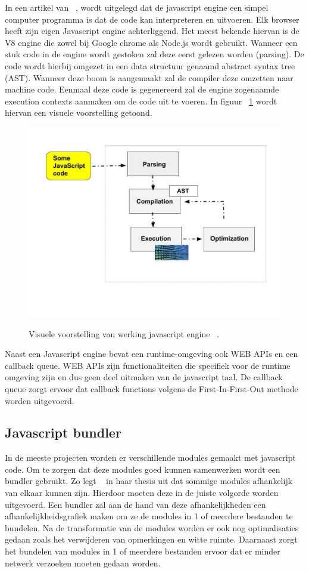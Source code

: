 In een artikel van ~\textcite{Christopher}, 
wordt uitgelegd dat de javascript engine een simpel computer programma is dat de code kan interpreteren en uitvoeren.
Elk browser heeft zijn eigen Javascript engine achterliggend. Het meest bekende hiervan is de
V8 engine die zowel bij Google chrome als Node.js wordt gebruikt. 
Wanneer een stuk code in de engine wordt gestoken zal deze eerst gelezen worden (parsing). 
De code wordt hierbij omgezet in een data structuur genaamd abstract syntax tree (AST).
Wanneer deze boom is aangemaakt zal de compiler deze omzetten naar machine code. 
Eenmaal deze code is gegenereerd zal de engine zogenaamde execution contexts aanmaken om de code uit te voeren.
In figuur ~\ref{fig:javascriptengine} wordt hiervan een visuele voorstelling getoond.
\begin{figure}[H]
    \centering
    \includegraphics[width=.9\textwidth]{graphics/javascriptengine.jpeg}
    \caption{\label{fig:javascriptengine}}Visuele voorstelling van werking javascript engine ~\autocite{Christopher}.
\end{figure}

Naast een Javascript engine bevat een runtime-omgeving ook WEB APIs en een callback queue. 
WEB APIs zijn functionaliteiten die specifiek voor de runtime omgeving zijn en dus geen deel uitmaken van de javascript taal.
De callback queue zorgt ervoor dat callback functions volgens de First-In-First-Out methode worden uitgevoerd.

\subsection{Javascript bundler}
In de meeste projecten worden er verschillende modules gemaakt met javascript code. 
Om te zorgen dat deze modules goed kunnen samenwerken wordt een bundler gebruikt. 
Zo legt ~\textcite{Laurila2020} in haar thesis uit dat sommige modules afhankelijk van elkaar kunnen zijn. 
Hierdoor moeten deze in de juiste volgorde worden uitgevoerd. Een bundler zal aan de hand van deze afhankelijkheden 
een afhankelijkheidsgrafiek maken om ze de modules in 1 of meerdere bestanden te bundelen. 
Na de transformatie van de modules worden er ook nog optimalisaties gedaan zoals het verwijderen van opmerkingen en witte ruimte.
Daarnaast zorgt het bundelen van modules in 1 of meerdere bestanden ervoor dat er minder netwerk verzoeken moeten gedaan worden.

